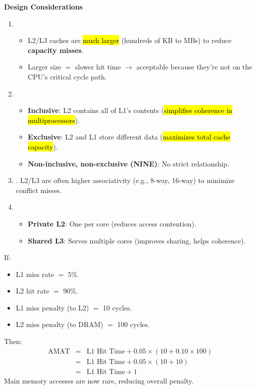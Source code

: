 \highspace
\begin{flushleft}
    \textcolor{Green3}{ \textbf{Design Considerations}}
\end{flushleft}
\begin{enumerate}
    \item {}
    \begin{itemize}
        \item L2/L3 caches are \hl{much larger} (hundreds of KB to MBs) to reduce \textbf{capacity misses}.
        \item Larger size $=$ slower hit time $\rightarrow$ acceptable because they're not on the CPU's critical cycle path.
    \end{itemize}
    \newpage
    \item {}
    \begin{itemize}
        \item \textbf{Inclusive}: L2 contains all of L1's contents (\hl{simplifies coherence in multiprocessors}).
        \item \textbf{Exclusive}: L2 and L1 store different data (\hl{maximizes total cache capacity}).
        \item \textbf{Non-inclusive, non-exclusive (NINE)}: No strict relationship.
    \end{itemize}
    \item {}. L2/L3 are often higher associativity (e.g., 8-way, 16-way) to minimize conflict misses.
    \item {}
    \begin{itemize}
        \item \textbf{Private L2}: One per core (reduces access contention).
        \item \textbf{Shared L3}: Serves multiple cores (improves sharing, helps coherence).
    \end{itemize}
\end{enumerate}

\highspace
\begin{examplebox}
    If:
    \begin{itemize}
        \item L1 miss rate $=$ 5\%.
        \item L2 hit rate $=$ 90\%.
        \item L1 miss penalty (to L2) $=$ 10 cycles.
        \item L2 miss penalty (to DRAM) $=$ 100 cycles.
    \end{itemize}
    Then:
    \begin{equation*}
        \begin{array}{rcl}
            \text{AMAT} &=& \text{L1 Hit Time} + 0.05 \times (10 + 0.10 \times 100) \\ [.3em]
            &=& \text{L1 Hit Time} + 0.05 \times (10 + 10) \\ [.3em]
            &=& \text{L1 Hit Time} + 1
        \end{array}
    \end{equation*}
    Main memory accesses are now rare, reducing overall penalty.
\end{examplebox}

